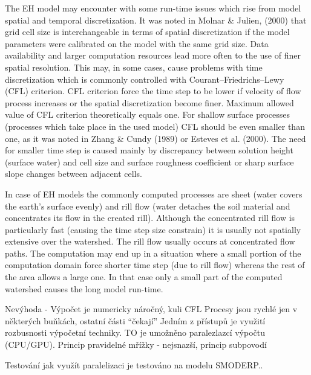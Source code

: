 The EH model may encounter with some run-time issues which rise from model spatial and temporal discretization. It was noted in Molnar & Julien, (2000) that grid cell size is interchangeable in terms of spatial discretization if the model parameters were calibrated on the model with the same grid size. Data availability and larger computation resources lead more often to the use of finer spatial resolution. This may, in some cases, cause problems with time discretization which is commonly controlled with Courant–Friedrichs–Lewy (CFL) criterion. CFL criterion force the time step to be lower if velocity of flow process increases or the spatial discretization become finer. Maximum allowed value of CFL criterion theoretically equals one. For shallow surface processes (processes which take place in the used model) CFL should be even smaller than one, as it was noted in Zhang & Cundy (1989) or Esteves et al. (2000). The need for smaller time step is caused mainly by discrepancy between solution height (surface water) and cell size and surface roughness coefficient or sharp surface slope changes between adjacent cells. 

In case of EH models the commonly computed processes are sheet (water covers the earth's surface evenly) and rill flow (water detaches the soil material and concentrates its flow in the created rill). Although the concentrated rill flow is particularly fast (causing  the time step size constrain) it is usually not spatially extensive over the watershed. The rill flow usually occurs at concentrated flow paths. The computation may end up in a situation where a small portion of the computation domain force shorter time step (due to rill flow)  whereas the rest of the area allows a large one. In that case only a small part of the computed watershed causes the long model run-time. 


Nevýhoda -  Výpočet je numericky náročný, kuli CFL
Procesy jsou rychlé jen v některých buňkách, ostatní části “čekají”
Jedním z přístupů je využití rozbusnosti výpočetní techniky. 
TO je umožněno paralezlazcí výpočtu (CPU/GPU). Princip pravidelné mřížky -  nejsnazší, princip      subpovodí     

Testování jak využít paralelizaci je testováno na modelu SMODERP..
